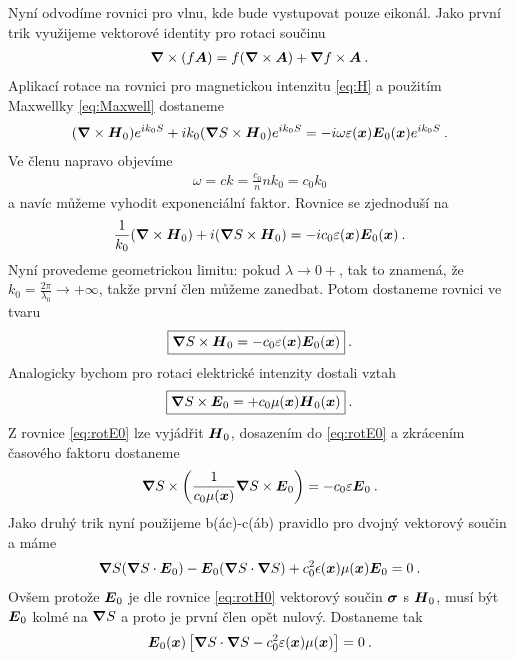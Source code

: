 Nyní odvodíme rovnici pro vlnu, kde bude vystupovat pouze eikonál. Jako první trik využijeme vektorové identity pro rotaci součinu \begin{align}
    \boldsymbol{\nabla} \times (f \boldsymbol{A}) = f (\boldsymbol{\nabla} \times \boldsymbol{A}) + \boldsymbol{\nabla} f \times \boldsymbol{A} \:.
\end{align}
Aplikací rotace na rovnici pro magnetickou intenzitu \eqref{eq:H} a použitím Maxwellky \eqref{eq:Maxwell} dostaneme \begin{align}
    (\boldsymbol{\nabla} \times \boldsymbol{H}_0) e^{ik_0 S} + ik_0 (\boldsymbol{\nabla}  S \times \boldsymbol{H}_0) e^{ik_0 S} = -  i \omega \varepsilon (\boldsymbol{x}) \boldsymbol{E}_0 (\boldsymbol{x}) e^{i k_0 S} \:.
\end{align}
Ve členu napravo objevíme \begin{align}
    \omega = c k = \frac{c_0}{n} n k_0 =c_0 k_0
\end{align}
a navíc můžeme vyhodit exponenciální faktor. Rovnice se zjednoduší na \begin{align}
     \frac{1}{k_0} (\boldsymbol{\nabla} \times \boldsymbol{H}_0)+ i (\boldsymbol{\nabla} S \times \boldsymbol{H}_0)  = -  i c_0  \varepsilon (\boldsymbol{x}) \boldsymbol{E}_0 (\boldsymbol{x}) \:.
\end{align}
Nyní provedeme geometrickou limitu: pokud $\lambda \rightarrow 0+$, tak to znamená, že $k_0 = \frac{2 \pi}{\lambda_0} \rightarrow + \infty$, takže první člen můžeme zanedbat. Potom dostaneme rovnici ve tvaru \begin{align}
    \boxed{ \boldsymbol{\nabla}  S \times \boldsymbol{H}_0  = -  c_0  \varepsilon (\boldsymbol{x}) \boldsymbol{E}_0 (\boldsymbol{x}) } \:. \label{eq:rotH0}
\end{align}
Analogicky bychom pro rotaci elektrické intenzity dostali vztah \begin{align}
    \boxed{ \boldsymbol{\nabla}  S \times \boldsymbol{E}_0  = + c_0  \mu (\boldsymbol{x}) \boldsymbol{H}_0 (\boldsymbol{x}) } \:. \label{eq:rotE0}
\end{align}
Z rovnice \eqref{eq:rotE0} lze vyjádřit $\boldsymbol{H}_0$, dosazením do \eqref{eq:rotE0} a zkrácením časového faktoru dostaneme \begin{align}
    \boldsymbol{\nabla} S \times \left( \frac{1}{c_0 \mu (\boldsymbol{x})} \boldsymbol{\nabla} S \times \boldsymbol{E}_0\right) = - c_0 \varepsilon \boldsymbol{E}_0 \:.
\end{align}
Jako druhý trik nyní použijeme b(ác)-c(áb) pravidlo pro dvojný vektorový součin a máme
\begin{align}
    \boldsymbol{\nabla} S (\boldsymbol{\nabla} S \cdot \boldsymbol{E}_0) - \boldsymbol{E}_0 (\boldsymbol{\nabla} S \cdot \boldsymbol{\nabla} S) + c_0^2 \epsilon(\boldsymbol{x}) \mu(\boldsymbol{x}) \boldsymbol{E}_0 = 0 \:.
\end{align}
Ovšem protože $\boldsymbol{E}_0$ je dle rovnice \eqref{eq:rotH0} vektorový součin $\boldsymbol{\sigma}$ s $\boldsymbol{H}_0$, musí být $\boldsymbol{E}_0$ kolmé na $\boldsymbol{\nabla} S$ a proto je první člen opět nulový. Dostaneme tak \begin{align}
    \boldsymbol{E}_0(\boldsymbol{x}) \left[ \boldsymbol{\nabla} S \cdot \boldsymbol{\nabla} S - c_0^2 \varepsilon(\boldsymbol{x}) \mu(\boldsymbol{x}) \right] = 0 \:.
\end{align}
